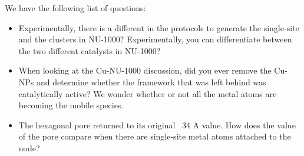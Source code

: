 \documentclass[journal=jctcce,manuscript=article]{achemso}
\begin{document}
We have the following list of questions:
\begin{itemize}
    \item Experimentally, there is a different in the protocols to generate the single-site and the clusters in NU-1000? Experimentally, you can differentiate between the two different catalysts in NU-1000? 
    \item When looking at the Cu-NU-1000 discussion, did you ever remove the Cu-NPs and determine whether the framework that was left behind was catalytically active? We wonder whether or not all the metal atoms are becoming the mobile  species. 
    \item The hexagonal pore returned to its original ~34 A value. How does the value of the pore compare when there are single-site metal atoms attached to the node? 
\end{itemize}



\end{document}
